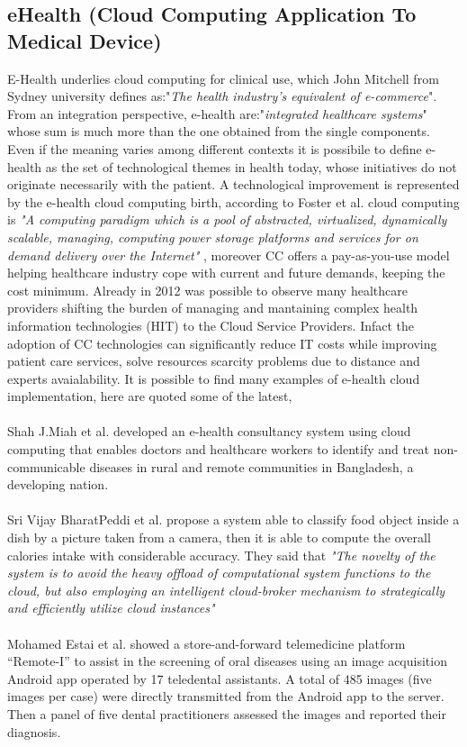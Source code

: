 \subsection{eHealth (Cloud Computing Application To Medical Device)}
E-Health underlies cloud computing for clinical use, which John Mitchell from Sydney university defines as:"\textit{The health industry's equivalent of e-commerce}". From an integration perspective, e-health are:"\textit{integrated healthcare systems}" whose sum is much more than the one obtained from the single components. Even if the meaning varies among different contexts \cite{Eysenbach} it is possibile to define e-health as the set of technological themes in health today, whose initiatives do not originate necessarily with the patient. \cite{oh}\cite{DellaMea}
A technological improvement is represented by the e-health cloud computing birth, according to Foster et al. cloud computing is \textit{"A computing paradigm which is a pool of abstracted, virtualized, dynamically scalable, managing, computing power storage platforms and services  for on demand delivery over the Internet"} \cite{foster}, moreover CC offers a pay-as-you-use model helping healthcare industry cope with current and future demands, keeping the cost minimum. \cite{AbuKhousa}
Already in 2012 was possible to observe many healthcare providers shifting the burden of managing and mantaining complex health information technologies (HIT) to the Cloud Service Providers. \cite{foster}
Infact the adoption of CC technologies can significantly reduce IT costs while improving patient care services, solve resources scarcity problems due to distance and experts avaialability. \cite{AbuKhousa}
It is possible to find many examples of e-health cloud implementation, here are quoted some of the latest,\\\\
Shah J.Miah et al. developed an e-health consultancy system using cloud computing that enables doctors and healthcare workers to identify and treat non-communicable diseases in rural and remote communities in Bangladesh, a developing nation. \cite{MIAH2017311}\\\\
Sri Vijay BharatPeddi et al. propose a system able to classify food object inside a dish by a picture taken from a camera, then it is able to compute the overall calories intake with considerable accuracy. They said that \textit{"The novelty of the system is to avoid the  heavy offload of computational system functions to the cloud, but also employing an intelligent cloud-broker mechanism to strategically and efficiently utilize cloud instances"} \cite{PEDDI201771}\\\\
Mohamed Estai et al. showed a store-and-forward telemedicine platform “Remote-I” to assist in the screening of oral diseases using an image acquisition Android app operated by 17 teledental assistants. A total of 485 images (five images per case) were directly transmitted from the Android app to the server. Then a panel of five dental practitioners assessed the images and reported their diagnosis.\cite{mohamedestai}